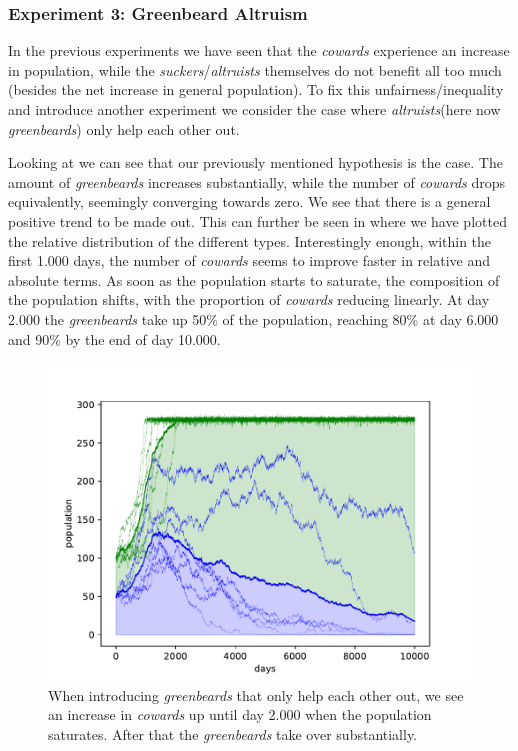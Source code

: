 \documentclass[sigconf]{acmart}
\newcommand{\cowards}{\textit{cowards}\xspace}
\newcommand{\altruists}{\textit{altruists}\xspace}
\newcommand{\suckers}{\textit{suckers}\xspace}
\newcommand{\greenbeards}{\textit{greenbeards}\xspace}
\begin{document}
    \subsubsection*{Experiment 3: Greenbeard Altruism}
    In the previous experiments we have seen that the \cowards experience an increase in population, while the \suckers/\altruists themselves do not benefit all too much (besides the net increase in general population).
    To fix this unfairness/inequality and introduce another experiment we consider the case where \altruists (here now \greenbeards) only help each other out.

    Looking at  we can see that our previously mentioned hypothesis is the case.
    The amount of \greenbeards increases substantially, while the number of \cowards drops equivalently, seemingly converging towards zero.
    We see that there is a general positive trend to be made out.
    This can further be seen in  where we have plotted the relative distribution of the different types.
    Interestingly enough, within the first 1.000 days, the number of \cowards seems to improve faster in relative and absolute terms.
    As soon as the population starts to saturate, the composition of the population shifts, with the proportion of \cowards reducing linearly.
    At day 2.000 the \greenbeards take up 50\% of the population, reaching 80\% at day 6.000 and 90\% by the end of day 10.000.



    \begin{figure}
        \includegraphics[width=\columnwidth]{figures/exp3_greebeard}
        \caption{When introducing \greenbeards that only help each other out, we see an increase in \cowards up until day 2.000 when the population saturates.
        After that the \greenbeards take over substantially.}
        \label{fig:exp3_greenbeard}
    \end{figure}
\end{document}
